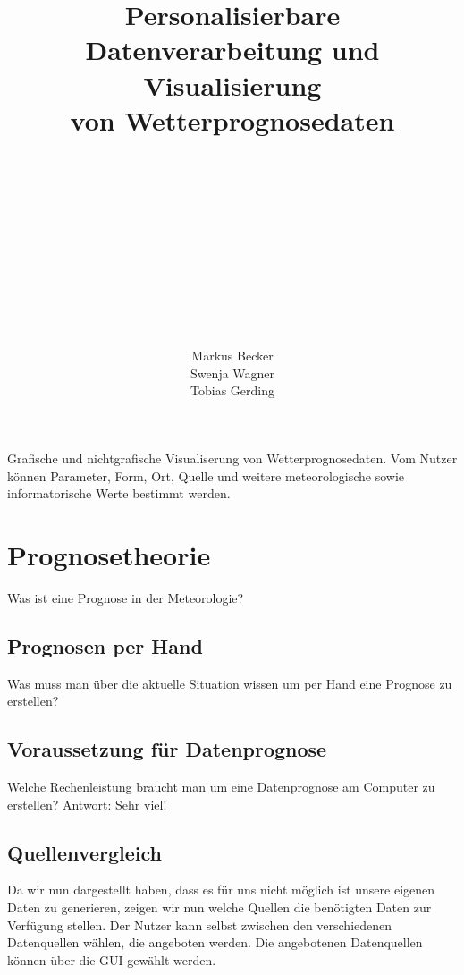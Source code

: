 \documentclass[a4paper,oneside,10pt,titlepage]{article}
\begin{document}
\linespread{.9}
\pagestyle{empty}
\title{Personalisierbare\\Datenverarbeitung und Visualisierung\\von Wetterprognosedaten}
\author{\\\\\\\\\\\\\\\\\\\\\\Markus Becker\\Swenja Wagner\\Tobias Gerding}

\maketitle
\pagestyle{empty}
\tableofcontents
\thispagestyle{empty}
\pagestyle{plain}
\newpage

Grafische und nichtgrafische Visualiserung von Wetterprognosedaten. Vom Nutzer können Parameter, Form, Ort, Quelle und weitere meteorologische sowie informatorische Werte bestimmt werden.  
\section{Prognosetheorie}
Was ist eine Prognose in der Meteorologie?
\subsection{Prognosen per Hand}
Was muss man über die aktuelle Situation wissen um per Hand eine Prognose zu erstellen?
\subsection{Voraussetzung für Datenprognose}
Welche Rechenleistung braucht man um eine Datenprognose am Computer zu erstellen? Antwort: Sehr viel!
\subsection{Quellenvergleich}
Da wir nun dargestellt haben, dass es für uns nicht möglich ist unsere eigenen Daten zu generieren, zeigen wir nun welche Quellen die benötigten Daten zur Verfügung stellen. Der Nutzer kann selbst zwischen den verschiedenen Datenquellen wählen, die angeboten werden. Die angebotenen Datenquellen können über die GUI gewählt werden.
\end{document}
